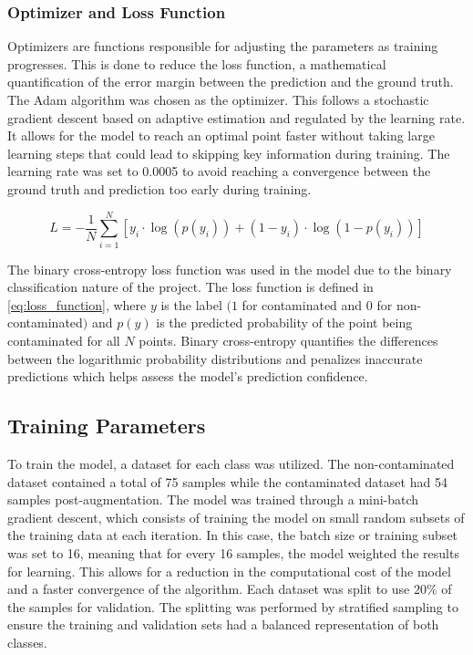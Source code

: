 \documentclass[12pt]{report}
\renewcommand{\cite}{\supercite}
\begin{document}
\subsubsection{Optimizer and Loss Function}
Optimizers are functions responsible for adjusting the parameters as training progresses.\cite{eitcaacademy_2023_what} This is done to reduce the loss function, a mathematical quantification of the error margin between the prediction and the ground truth. The Adam algorithm was chosen as the optimizer. This follows a stochastic gradient descent based on adaptive estimation and regulated by the learning rate.\cite{kerasteam_keras} It allows for the model to reach an optimal point faster without taking large learning steps that could lead to skipping key information during training. The learning rate was set to 0.0005 to avoid reaching a convergence between the ground truth and prediction too early during training.

\begin{equation}
    L = -\frac{1}{N} \sum_{i=1}^{N} \left[ y_i \cdot \log(p(y_i)) + (1 - y_i) \cdot \log(1 - p(y_i)) \right]
    \label{eq:loss_function}
\end{equation}

The binary cross-entropy loss function was used in the model due to the binary classification nature of the project. The loss function is defined in \autoref{eq:loss_function}, where $y$ is the label $(1$ for contaminated and $0$ for non-contaminated$)$ and $p(y)$ is the predicted probability of the point being contaminated for all $N$ points. Binary cross-entropy quantifies the differences between the logarithmic probability distributions and penalizes inaccurate predictions which helps assess the model’s prediction confidence.

\subsection{Training Parameters}
To train the model, a dataset for each class was utilized. The non-contaminated dataset contained a total of 75 samples while the contaminated dataset had 54 samples post-augmentation. The model was trained through a mini-batch gradient descent, which consists of training the model on small random subsets of the training data at each iteration.\cite{MiniBatchGradientajaymehta2023} In this case, the batch size or training subset was set to 16, meaning that for every 16 samples, the model weighted the results for learning.  This allows for a reduction in the computational cost of the model and a faster convergence of the algorithm. Each dataset was split to use $20\%$ of the samples for validation. The splitting was performed by stratified sampling to ensure the training and validation sets had a balanced representation of both classes.
\end{document}
